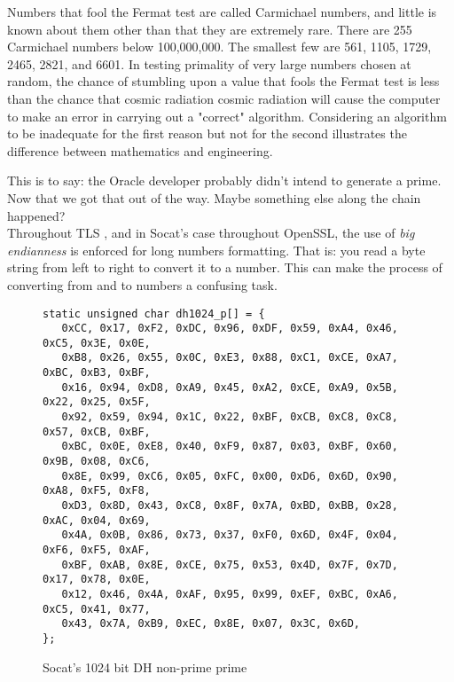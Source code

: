 \documentclass[a4paper,11pt]{article}
\begin{document}
\begin{displayquote}
Numbers that fool the Fermat test are called Carmichael numbers, and little is known about them other than that they are extremely rare. There are 255 Carmichael numbers below 100,000,000. The smallest few are 561, 1105, 1729, 2465, 2821, and 6601. In testing primality of very large numbers chosen at random, the chance of stumbling upon a value that fools the Fermat test is less than the chance that cosmic radiation cosmic radiation will cause the computer to make an error in carrying out a "correct" algorithm. Considering an algorithm to be inadequate for the first reason but not for the second illustrates the difference between mathematics and engineering.
\end{displayquote}

This is to say: the Oracle developer probably didn't intend to generate a prime. Now that we got that out of the way. Maybe something else along the chain happened?\\

Throughout TLS \cite{tls12}, and in Socat's case throughout OpenSSL, the use of \emph{big endianness} is enforced for long numbers formatting. That is: you read a byte string from left to right to convert it to a number. This can make the process of converting from and to numbers a confusing task.

\begin{figure}[H]
\begin{verbatim}
static unsigned char dh1024_p[] = {
   0xCC, 0x17, 0xF2, 0xDC, 0x96, 0xDF, 0x59, 0xA4, 0x46, 0xC5, 0x3E, 0x0E, 
   0xB8, 0x26, 0x55, 0x0C, 0xE3, 0x88, 0xC1, 0xCE, 0xA7, 0xBC, 0xB3, 0xBF, 
   0x16, 0x94, 0xD8, 0xA9, 0x45, 0xA2, 0xCE, 0xA9, 0x5B, 0x22, 0x25, 0x5F, 
   0x92, 0x59, 0x94, 0x1C, 0x22, 0xBF, 0xCB, 0xC8, 0xC8, 0x57, 0xCB, 0xBF, 
   0xBC, 0x0E, 0xE8, 0x40, 0xF9, 0x87, 0x03, 0xBF, 0x60, 0x9B, 0x08, 0xC6, 
   0x8E, 0x99, 0xC6, 0x05, 0xFC, 0x00, 0xD6, 0x6D, 0x90, 0xA8, 0xF5, 0xF8, 
   0xD3, 0x8D, 0x43, 0xC8, 0x8F, 0x7A, 0xBD, 0xBB, 0x28, 0xAC, 0x04, 0x69, 
   0x4A, 0x0B, 0x86, 0x73, 0x37, 0xF0, 0x6D, 0x4F, 0x04, 0xF6, 0xF5, 0xAF, 
   0xBF, 0xAB, 0x8E, 0xCE, 0x75, 0x53, 0x4D, 0x7F, 0x7D, 0x17, 0x78, 0x0E, 
   0x12, 0x46, 0x4A, 0xAF, 0x95, 0x99, 0xEF, 0xBC, 0xA6, 0xC5, 0x41, 0x77, 
   0x43, 0x7A, 0xB9, 0xEC, 0x8E, 0x07, 0x3C, 0x6D, 
};
\end{verbatim}
\caption{Socat's 1024 bit DH non-prime prime}
\label{fig:cert}
\end{figure}
\end{document}
